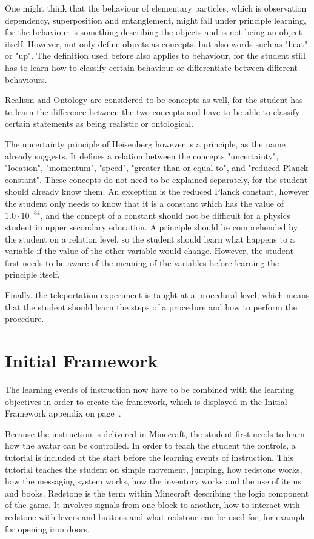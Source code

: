 \documentclass[11pt,twoside]{report} %
\begin{document}
One might think that the behaviour of elementary particles, which is observation dependency, superposition and entanglement, might fall under principle learning, for the behaviour is something describing the objects and is not being an object itself. However,  not only define objects as concepts, but also words such as "heat" or "up". The definition used before also applies to behaviour, for the student still has to learn how to classify certain behaviour or differentiate between different behaviours.

Realism and Ontology are considered to be concepts as well, for the student has to learn the difference between the two concepts and have to be able to classify certain statements as being realistic or ontological.

The uncertainty principle of Heisenberg however is a principle, as the name already suggests. It defines a relation between the concepts "uncertainty", "location", "momentum", "speed", "greater than or equal to", and "reduced Planck constant". These concepts do not need to be explained separately, for the student should already know them. An exception is the reduced Planck constant, however the student only needs to know that it is a constant which has the value of $1.0 \cdot 10^{-34}$, and the concept of a constant should not be difficult for a physics student in upper secondary education. A principle should be comprehended by the student on a relation level, so the student should learn what happens to a variable if the value of the other variable would change. However, the student first needs to be aware of the meaning of the variables before learning the principle itself.

Finally, the teleportation experiment is taught at a procedural level, which means that the student should learn the steps of a procedure and how to perform the procedure.

\section{Initial Framework}

The learning events of instruction now have to be combined with the learning objectives in order to create the framework, which is displayed in the Initial Framework appendix on page~\pageref{app:framework1}.

Because the instruction is delivered in Minecraft, the student first needs to learn how the avatar can be controlled. In order to teach the student the controls, a tutorial is included at the start before the learning events of instruction. This tutorial teaches the student on simple movement, jumping, how redstone works, how the messaging system works, how the inventory works and the use of items and books. Redstone is the term within Minecraft describing the logic component of the game. It involves signals from one block to another, how to interact with redstone with levers and buttons and what redstone can be used for, for example for opening iron doors.
\end{document}
